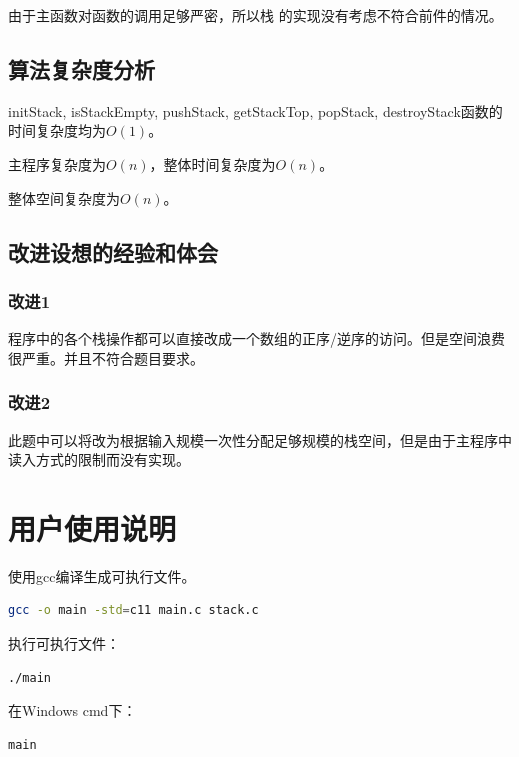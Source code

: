 \documentclass{article}
\begin{document}
由于主函数对函数的调用足够严密，所以栈 的实现没有考虑不符合前件的情况。

\subsection{算法复杂度分析}

initStack, isStackEmpty, pushStack, getStackTop, popStack, destroyStack函数的时间复杂度均为$O(1)$。

主程序复杂度为$O(n)$，整体时间复杂度为$O(n)$。

整体空间复杂度为$O(n)$。

\subsection{改进设想的经验和体会}

\subsubsection{改进1}

程序中的各个栈操作都可以直接改成一个数组的正序/逆序的访问。但是空间浪费很严重。并且不符合题目要求。

\subsubsection{改进2}

此题中可以将改为根据输入规模一次性分配足够规模的栈空间，但是由于主程序中读入方式的限制而没有实现。

\section{用户使用说明}

使用gcc编译生成可执行文件。

\begin{lstlisting}[language={bash},
    basicstyle=\small\consolas]
gcc -o main -std=c11 main.c stack.c
\end{lstlisting}

执行可执行文件：

\begin{lstlisting}[language={bash},
    basicstyle=\small\consolas]
./main
\end{lstlisting}

在Windows cmd下：

\begin{lstlisting}[language={bash},
    basicstyle=\small\consolas]
main
\end{lstlisting}
\end{document}
